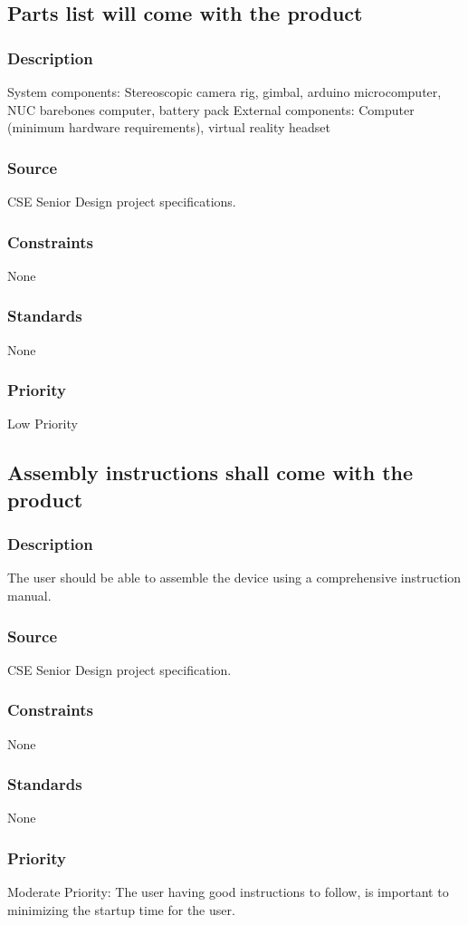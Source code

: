 
\subsection{Parts list will come with the product}
\subsubsection{Description}
System components: Stereoscopic camera rig, gimbal, arduino microcomputer, NUC barebones computer, battery pack
External components: Computer (minimum hardware requirements), virtual reality headset
\subsubsection{Source}
CSE Senior Design project specifications.
\subsubsection{Constraints}
None
\subsubsection{Standards}
None
\subsubsection{Priority}
Low Priority

\subsection{Assembly instructions shall come with the product}
\subsubsection{Description}
The user should be able to assemble the device using a comprehensive instruction manual.
\subsubsection{Source}
CSE Senior Design project specification.
\subsubsection{Constraints}
None
\subsubsection{Standards}
None
\subsubsection{Priority}
Moderate Priority: The user having good instructions to follow, is important to minimizing the startup time for the user.

